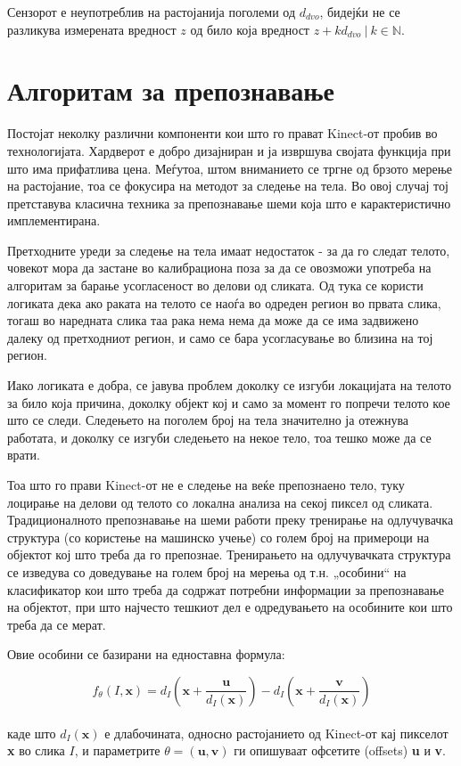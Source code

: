 \documentclass[12pt]{article}
\begin{document}
		Сензорот е неупотреблив на растојанија поголеми од $d_{dvo}$, бидејќи не се разликува измерената вредност $z$ од било која вредност $z + k d_{dvo}\ | \ k \in \mathbb{N}$.

\newpage

\section{Алгоритам за препознавање}

  Постојат неколку различни компоненти кои што го прават Kinect-от пробив во технологијата. Хардверот е добро дизајниран и ја извршува својата функција при што има прифатлива цена. Меѓутоа, штом вниманието се тргне од брзото мерење на растојание, тоа се фокусира на методот за следење на тела. Во овој случај тој претставува класична техника за препознавање шеми која што е карактеристично имплементирана.\bigbreak

	Претходните уреди за следење на тела имаат недостаток - за да го следат телото, човекот мора да застане во калибрациона поза за да се овозможи употреба на алгоритам за барање усогласеност во делови од сликата. Од тука се користи логиката дека ако раката на телото се наоѓа во одреден регион во првата слика, тогаш во наредната слика таа рака нема нема да може да се има задвижено далеку од претходниот регион, и само се бара усогласување во близина на тој регион.\bigbreak

	Иако логиката е добра, се јавува проблем доколку се изгуби локацијата на телото за било која причина, доколку објект кој и само за момент го попречи телото кое што се следи. Следењето на поголем број на тела значително ја отежнува работата, и доколку се изгуби следењето на некое тело, тоа тешко може да се врати.\bigbreak

	Тоа што го прави Kinect-от не е следење на веќе препознаено тело, туку лоцирање на делови од телото со локална анализа на секој пиксел од сликата. Традиционалното препознавање на шеми работи преку тренирање на одлучувачка структура (со користење на машинско учење) со голем број на примероци на објектот кој што треба да го препознае. Тренирањето на одлучувачката структура се изведува со доведување на голем број на мерења од т.н. „особини“ на класификатор кои што треба да содржат потребни информации за препознавање на објектот, при што најчесто тешкиот дел е одредувањето на особините кои што треба да се мерат.\bigbreak

	Овие особини се базирани на едноставна формула:

  \begin{equation} \label{eq:depth}
	  f_\theta(I,\textbf{x}) = d_I(\textbf{x}+\frac{\textbf{u}}{d_I(\textbf{x})}) - d_I(\textbf{x}+\frac{\textbf{v}}{d_I(\textbf{x})})
    \end{equation}
  \\
  каде што $d_I(\textbf{x})$ е длабочината, односно растојанието од Kinect-от кај пикселот \textbf{x} во слика $I$, и параметрите $\theta = (\textbf{u},\textbf{v})$ ги опишуваат офсетите (offsets) \textbf{u} и \textbf{v}.
\end{document}
